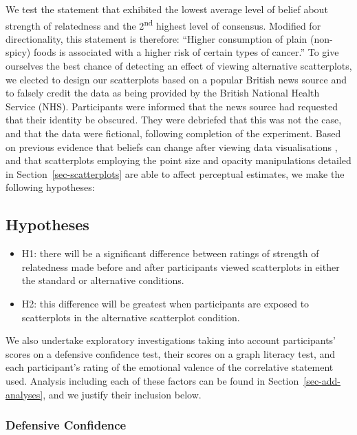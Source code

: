 \documentclass[sigconf]{acmart}
\providecommand{\tightlist}{%
  \setlength{\itemsep}{0pt}\setlength{\parskip}{0pt}}\usepackage{longtable,booktabs,array}
\begin{document}
We test the statement that exhibited the lowest average level of belief
about strength of relatedness and the 2\textsuperscript{nd} highest
level of consensus. Modified for directionality, this statement is
therefore: ``Higher consumption of plain (non-spicy) foods is associated
with a higher risk of certain types of cancer.'' To give ourselves the
best chance of detecting an effect of viewing alternative scatterplots,
we elected to design our scatterplots based on a popular British news
source and to falsely credit the data as being provided by the British
National Health Service (NHS). Participants were informed that the news
source had requested that their identity be obscured. They were
debriefed that this was not the case, and that the data were fictional,
following completion of the experiment. Based on previous evidence that
beliefs can change after viewing data visualisations
\citep{karduni_2020, markant_2023}, and that scatterplots employing the
point size and opacity manipulations detailed in
Section~\ref{sec-scatterplots} are able to affect perceptual estimates,
we make the following hypotheses:

\subsection{Hypotheses}\label{hypotheses}

\begin{itemize}
\tightlist
\item
  H1: there will be a significant difference between ratings of strength
  of relatedness made before and after participants viewed scatterplots
  in either the standard or alternative conditions.
\item
  H2: this difference will be greatest when participants are exposed to
  scatterplots in the alternative scatterplot condition.
\end{itemize}

We also undertake exploratory investigations taking into account
participants' scores on a defensive confidence test, their scores on a
graph literacy test, and each participant's rating of the emotional
valence of the correlative statement used. Analysis including each of
these factors can be found in Section~\ref{sec-add-analyses}, and we
justify their inclusion below.

\subsubsection{Defensive Confidence}\label{sec-def-con}
\end{document}
